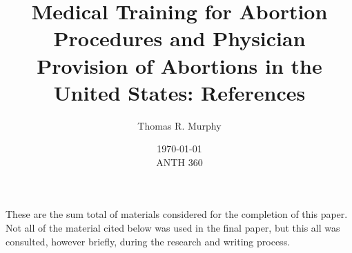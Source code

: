 \documentclass[letterpaper, 12pt]{article}
\title{Medical Training for Abortion Procedures and Physician Provision of Abortions in the United States: References}
\author{Thomas R. Murphy}
\date{\today\\ANTH 360}
\begin{document}
\maketitle

These are the sum total of materials considered for the completion of this paper. Not all of the material cited below was used in the final paper, but this all was consulted, however briefly, during the research and writing process.

\nocite{*}
\printbibliography
\end{document}
